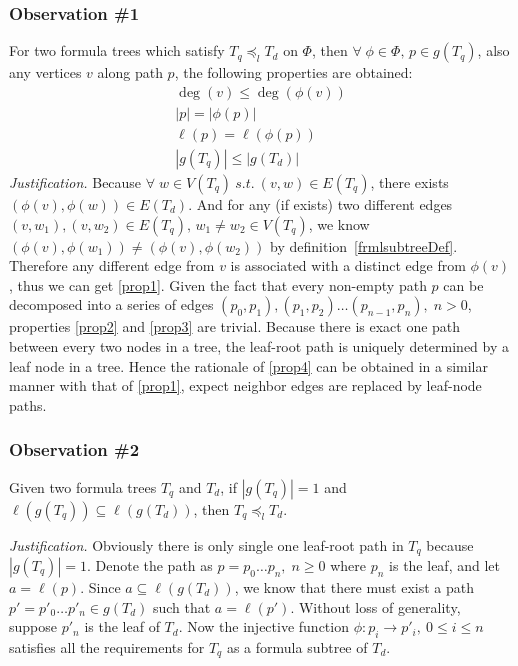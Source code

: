 \subsubsection*{Observation \#1} 
For two formula trees which satisfy $T_q \preceq_l T_d$ on $\Phi$, then $\forall\; \phi \in \Phi,\, p \in g(T_q)$, also any vertices $v$ along path $p$, the following properties are obtained:
\begin{eqnarray}
\deg(v) \le \deg(\phi(v)) \label{prop1} \\
\left| p \right| = \left| \phi(p) \right| \label{prop2} \\
\ell(p) = \ell(\phi(p)) \label{prop3} \\
\left| g(T_q) \right| \le \left| g(T_d) \right| \label{prop4}
\end{eqnarray}
\textit{Justification.} 
Because $\forall\; w \in V(T_q) \  s.t. \  (v, w) \in E(T_q)$, there exists $(\phi(v), \phi(w)) \in E(T_d)$. 
And for any (if exists) two different edges $(v, w_1), (v, w_2) \in E(T_q),\, w_1 \not= w_2 \in V(T_q) $, we know $(\phi(v), \phi(w_1)) \not= (\phi(v), \phi(w_2))$ by definition~\ref{frmlsubtreeDef}. 
Therefore any different edge from $v$ is associated with a distinct edge from $\phi(v)$, thus we can get \ref{prop1}. 
Given the fact that every non-empty path $p$ can be decomposed into a series of edges $(p_0, p_1), (p_1, p_2) \ldots (p_{n-1}, p_n), \; n > 0$,
properties \ref{prop2} and \ref{prop3} are trivial.
Because there is exact one path between every two nodes in a tree, the leaf-root path is uniquely determined by a leaf node in a tree. Hence the rationale of \ref{prop4} can be obtained in a similar manner with that of \ref{prop1}, expect neighbor edges are replaced by leaf-node paths.


\subsubsection*{Observation \#2} 
Given two formula trees $T_q$ and $T_d$, if $\left| g(T_q) \right| = 1$ and $\ell(g(T_{q})) \subseteq \ell(g(T_d))$, then $T_q \preceq_l T_d$.

\noindent \textit{Justification.} 
Obviously there is only single one leaf-root path in $T_q$ because $\left| g(T_q) \right| = 1$. 
Denote the path as $p = p_0 \ldots p_n,\; n \ge 0$ where $p_n$ is the leaf, and let $a = \ell(p)$.
Since $a \subseteq \ell(g(T_d))$, we know that there must exist a path $p'=p'_0 \ldots p'_n \in g(T_d)$ such that $a = \ell(p')$.
Without loss of generality, suppose $p'_n$ is the leaf of $T_d$. 
Now the injective function $\phi: p_i \rightarrow p'_i,\  0 \le i \le n$ satisfies all the requirements for $T_q$ as a formula subtree of $T_d$.

